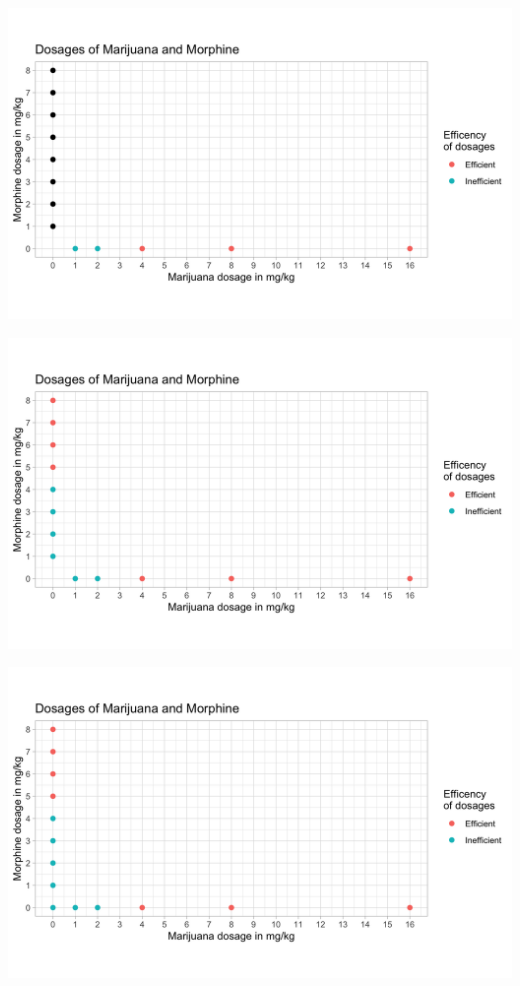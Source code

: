 \documentclass[14pt]{beamer}
\begin{document}
\begin{frame}
\begin{center}
\includegraphics[scale=0.23]{img3.png}
\end{center}
\end{frame}

\begin{frame}
\begin{center}
\includegraphics[scale=0.23]{img4.png}
\end{center}
\end{frame}

\begin{frame}
\begin{center}
\includegraphics[scale=0.23]{img5.png}
\end{center}
\end{frame}
\end{document}
